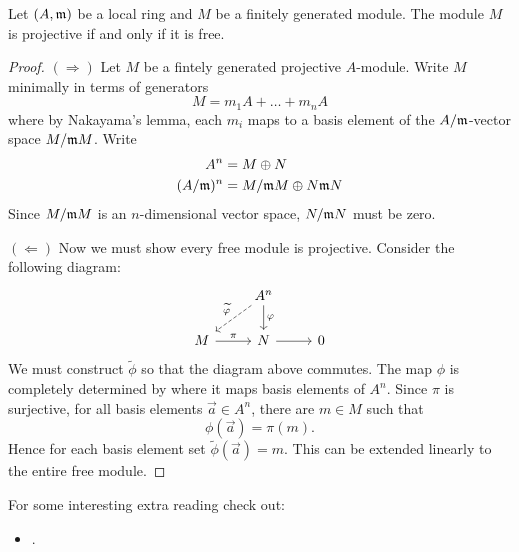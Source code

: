 \documentclass{ximera}
\begin{document}
\begin{corollary}
  Let $(A,\mathfrak{m})$ be a local ring and $M$ be a finitely generated
  module. The module $M$ is projective if and only if it is free.
  \begin{proof}
    $(\Rightarrow)$ Let $M$ be a fintely generated projective
    $A$-module. Write $M$ minimally in terms of generators
    \[
    M = m_1 A + \dots + m_n A
    \]
    where by Nakayama's lemma, each $m_i$ maps to a basis element of
    the $A/\mathfrak{m}$-vector space $M/\mathfrak{m} M$.  Write
    \begin{align*}
      A^n &= M\oplus N \\
      (A/\mathfrak{m})^n &= M/\mathfrak{m} M \oplus N\mathfrak{m} N
    \end{align*}
    Since $M/\mathfrak{m} M$ is an $n$-dimensional vector space, $N/\mathfrak{m} N$ must
    be zero.

    $(\Leftarrow)$ Now we must show every free module is
    projective. Consider the following diagram:
    \[
    \begin{tikzcd}
                         & A^n\arrow[dl,dashed,swap,"\tilde\phi"]\arrow[d,"\phi"] & \\
      M \arrow[r,"\pi"]  & N  \arrow[r] & 0 
    \end{tikzcd}
    \]
    We must construct $\tilde\phi$ so that the diagram above
    commutes. The map $\phi$ is completely determined by where it maps
    basis elements of $A^n$. Since $\pi$ is surjective, for all basis
    elements $\vec{a}\in A^n$, there are $m\in M$ such that
    \[
    \phi(\vec{a}) = \pi(m).
    \]
    Hence for each basis element set $\tilde\phi(\vec{a}) = m$. This
    can be extended linearly to the entire free module.
  \end{proof}
\end{corollary}



For some interesting extra reading check out:
\begin{itemize}
\item{}.
\end{itemize}
\end{document}
